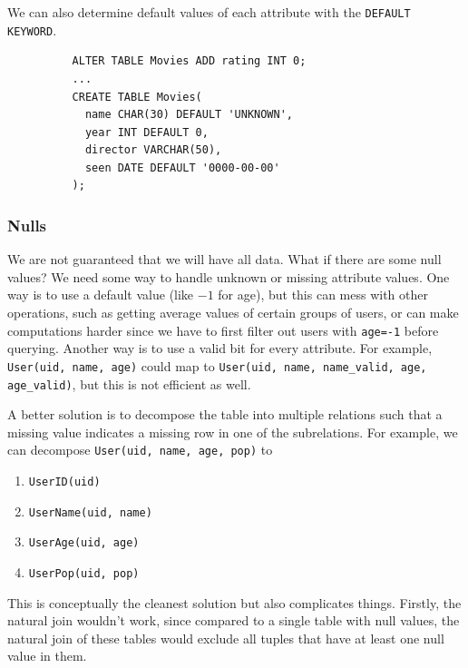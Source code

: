 \documentclass{article}
\begin{document}
      \begin{theorem}
        We can also determine default values of each attribute with the \texttt{DEFAULT KEYWORD}. 
        \begin{lstlisting}
          ALTER TABLE Movies ADD rating INT 0; 
          ...
          CREATE TABLE Movies(
            name CHAR(30) DEFAULT 'UNKNOWN', 
            year INT DEFAULT 0, 
            director VARCHAR(50), 
            seen DATE DEFAULT '0000-00-00'
          ); 
        \end{lstlisting}
      \end{theorem}

    \subsubsection{Nulls}

      We are not guaranteed that we will have all data. What if there are some null values? We need some way to handle unknown or missing attribute values. One way is to use a default value (like $-1$ for age), but this can mess with other operations, such as getting average values of certain groups of users, or can make computations harder since we have to first filter out users with \texttt{age=-1} before querying. Another way is to use a valid bit for every attribute. For example, \texttt{User(uid, name, age)} could map to \texttt{User(uid, name, name\_valid, age, age\_valid)}, but this is not efficient as well. 

      A better solution is to decompose the table into multiple relations such that a missing value indicates a missing row in one of the subrelations. For example, we can decompose \texttt{User(uid, name, age, pop)} to 
      \begin{enumerate}
        \item \texttt{UserID(uid)}
        \item \texttt{UserName(uid, name)}
        \item \texttt{UserAge(uid, age)}
        \item \texttt{UserPop(uid, pop)}
      \end{enumerate}
      This is conceptually the cleanest solution but also complicates things. Firstly, the natural join wouldn't work, since compared to a single table with null values, the natural join of these tables would exclude all tuples that have at least one null value in them. 
\end{document}
